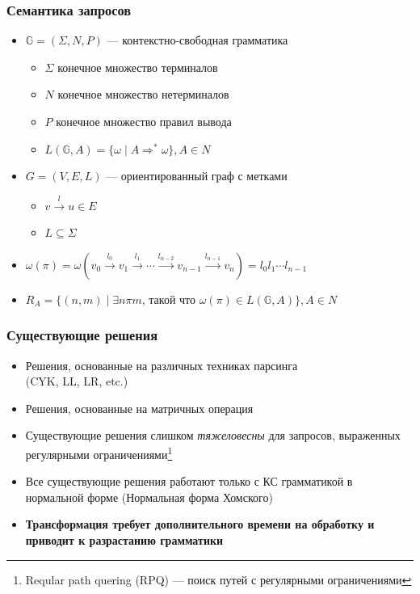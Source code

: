 \documentclass[xcolor=table,english]{beamer}
\begin{document}
\begin{frame}[fragile] \frametitle{Семантика запросов}
    \begin{itemize}
        \item $\mathbb{G} = (\Sigma, N, P)$ --- контекстно-свободная грамматика
        \begin{itemize}
            \item $\Sigma$ конечное множество терминалов
            \item $N$ конечное множество нетерминалов
            \item $P$ конечное множество правил вывода
            \item $L(\mathbb{G},A) = \{ \omega \mid A \Rightarrow^* \omega \}, A \in N$
        \end{itemize}
        \item $G = (V,E,L)$ --- ориентированный граф с метками
        \begin{itemize}
            \item $v \xrightarrow{l} u \in E$
            \item $L \subseteq \Sigma$
        \end{itemize}
        \item $\omega(\pi) = \omega(v_0 \xrightarrow{l_0} v_1 \xrightarrow{l_1} \cdots \xrightarrow{l_{n-2}} v_{n-1} \xrightarrow{l_{n-1}} v_n) = l_0 l_1 \cdots l_{n-1}$
        \item $R_A = \{ (n, m) \mid \exists n \pi m$, такой что $\omega(\pi) \in L(\mathbb{G},A)\}, A \in N$
    \end{itemize}
\end{frame}

\begin{frame}[fragile] \frametitle{Существующие решения}
	\begin{itemize}
		\item Решения, основанные на различных техниках парсинга \\ (CYK, LL, LR, etc.)
		\item Решения, основанные на матричных операция
		\item Существующие решения слишком \textit{тяжеловесны} для запросов, выраженных регулярными ограничениями\footnote{Reqular path quering (RPQ) --- поиск путей с регулярными ограничениями}
		\item Все существующие решения работают только с КС грамматикой в нормальной форме (Нормальная форма Хомского)
		\item \textbf{Трансформация требует дополнительного времени на обработку и приводит к разрастанию грамматики }
	\end{itemize}
\end{frame}
\end{document}
